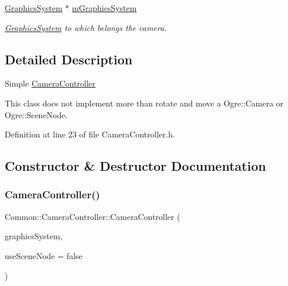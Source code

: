 \begin{DoxyCompactItemize}
\mbox{\label{class_common_1_1_camera_controller_ae2970e63d46f18b24b8a0ae4b6acf247}} 
\hyperlink{class_common_1_1_graphics_system}{Graphics\+System} $\ast$ \hyperlink{class_common_1_1_camera_controller_ae2970e63d46f18b24b8a0ae4b6acf247}{m\+Graphics\+System}
\begin{DoxyCompactList}\small\item\em \hyperlink{class_common_1_1_graphics_system}{Graphics\+System} to which belongs the camera. \end{DoxyCompactList}\end{DoxyCompactItemize}


\subsection{Detailed Description}
Simple \hyperlink{class_common_1_1_camera_controller}{Camera\+Controller}

This class does not implement more than rotate and move a Ogre\+::\+Camera or Ogre\+::\+Scene\+Node. 

Definition at line 23 of file Camera\+Controller.\+h.



\subsection{Constructor \& Destructor Documentation}
\mbox{\label{class_common_1_1_camera_controller_a09c9f866ac2161de31ff45694dd711fd}} 
\subsubsection{\texorpdfstring{Camera\+Controller()}{CameraController()}}
{\footnotesize\ttfamily Common\+::\+Camera\+Controller\+::\+Camera\+Controller (\begin{DoxyParamCaption}\item[{\hyperlink{class_common_1_1_graphics_system}{Graphics\+System} $\ast$}]{graphics\+System,  }\item[{bool}]{use\+Scene\+Node = {\ttfamily false} }\end{DoxyParamCaption})}

